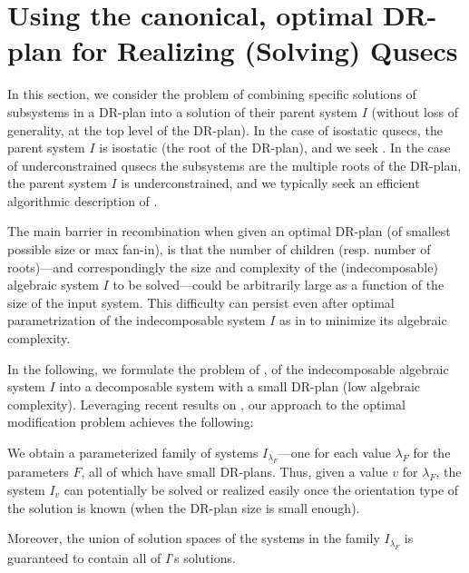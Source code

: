 \section{Using the canonical, optimal DR-plan for Realizing (Solving) Qusecs}
\label{sec:recomb}
%
In this section, we consider the  problem of combining specific solutions of subsystems in a DR-plan into a solution of their parent system $I$ (without loss of generality, at the top level of the DR-plan). In the case of isostatic qusecs, the parent system $I$ is isostatic (the root of the DR-plan), and we seek . In the case of underconstrained qusecs the subsystems are the multiple roots of the DR-plan, the parent system $I$ is underconstrained, and we typically seek an efficient algorithmic description of .

The main barrier in recombination when given an optimal DR-plan (of smallest possible size or max fan-in),  is that the number of children (resp. number of roots)---and correspondingly the  size and complexity of the (indecomposable) algebraic system $I$ to be solved---could be arbitrarily large as a function of the size of the input system. This difficulty can persist even after optimal parametrization of the indecomposable system $I$ as in \cite{sitharam2010optimized} to minimize its algebraic complexity.

In the following, we formulate the problem of , of the indecomposable algebraic system $I$ into a decomposable system with a small DR-plan (low algebraic complexity). Leveraging recent results on , our approach to the optimal modification problem achieves the following:

\medskip\noindent
{}
We obtain a  parameterized family of systems $I_{\lambda_F}$---one for each value $\lambda_F$ for the parameters $F$,  all of which have small DR-plans. Thus, given a value $v$ for $\lambda_F$, the system $I_v$ can potentially be solved or realized easily once the orientation type of the solution is known  (when the DR-plan size is small enough).

\medskip\noindent
{}
Moreover, the union of solution spaces of the systems in the family $I_{\lambda_F}$ is guaranteed to contain all of $I$'s solutions.


